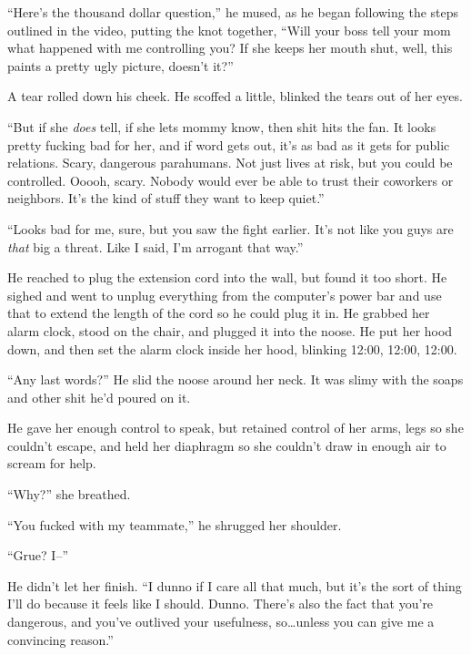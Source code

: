 ``Here's the thousand dollar question,'' he mused, as he began following the steps outlined in the video, putting the knot together, ``Will your boss tell your mom what happened with me controlling you?  If she keeps her mouth shut, well, this paints a pretty ugly picture, doesn't it?''



A tear rolled down his cheek.  He scoffed a little, blinked the tears out of her eyes.



``But if she \emph{does} tell, if she lets mommy know, then shit hits the fan.  It looks pretty fucking bad for her, and if word gets out, it's as bad as it gets for public relations.  Scary, dangerous parahumans.  Not just lives at risk, but you could be controlled.  Ooooh, scary.  Nobody would ever be able to trust their coworkers or neighbors.  It's the kind of stuff they want to keep quiet.''



``Looks bad for me, sure, but you saw the fight earlier.  It's not like you guys are \emph{that} big a threat.  Like I said, I'm arrogant that way.''



He reached to plug the extension cord into the wall, but found it too short.  He sighed and went to unplug everything from the computer's power bar and use that to extend the length of the cord so he could plug it in.  He grabbed her alarm clock, stood on the chair, and plugged it into the noose.  He put her hood down, and then set the alarm clock inside her hood, blinking 12:00, 12:00, 12:00.



``Any last words?''  He slid the noose around her neck.  It was slimy with the soaps and other shit he'd poured on it.



He gave her enough control to speak, but retained control of her arms, legs so she couldn't escape, and held her diaphragm so she couldn't draw in enough air to scream for help.



``Why?'' she breathed.



``You fucked with my teammate,'' he shrugged her shoulder.



``Grue?  I--''



He didn't let her finish.  ``I dunno if I care all that much, but it's the sort of thing I'll do because it feels like I should.  Dunno.  There's also the fact that you're dangerous, and you've outlived your usefulness, so\ldots unless you can give me a convincing reason.''



